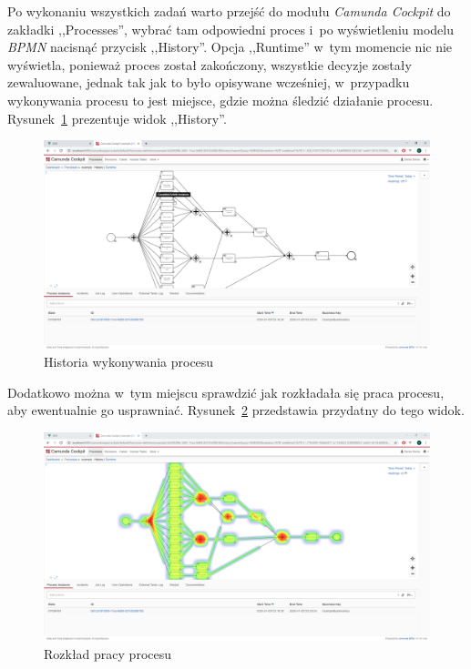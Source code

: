 Po wykonaniu wszystkich zadań warto przejść do modułu \emph{Camunda Cockpit} do zakładki ,,Processes'', wybrać tam odpowiedni proces i~po wyświetleniu modelu \emph{BPMN} nacisnąć przycisk ,,History''. Opcja ,,Runtime'' w~tym momencie nic nie wyświetla, ponieważ proces został zakończony, wszystkie decyzje zostały zewaluowane, jednak tak jak to było opisywane wcześniej, w~przypadku wykonywania procesu to jest miejsce, gdzie można śledzić działanie procesu. Rysunek~\ref{fig:camundaCockpitCompleted} prezentuje widok ,,History''. 
\begin{figure}
    \centering
    \includegraphics[width=\textwidth]{./assets/camundaCockpitCompleted.png}
    \caption{Historia wykonywania procesu}
    \label{fig:camundaCockpitCompleted}
\end{figure}
Dodatkowo można w~tym miejscu sprawdzić jak rozkładała się praca procesu, aby ewentualnie go usprawniać. Rysunek~\ref{fig:camundaCockpitHeat} przedstawia przydatny do tego widok.
\begin{figure}
    \centering
    \includegraphics[width=\textwidth]{./assets/camundaCockpitHeat.png}
    \caption{Rozkład pracy procesu}
    \label{fig:camundaCockpitHeat}
\end{figure} 

